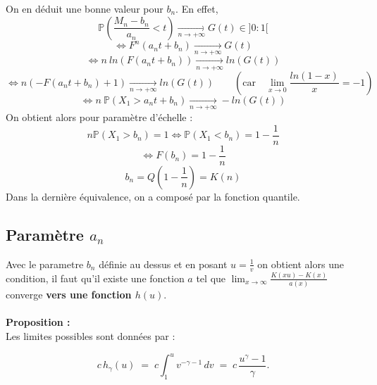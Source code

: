 \documentclass{article}
\begin{document}
On en déduit une bonne valeur pour $b_n$. En effet,
\[
\mathbb{P} \left( \frac{M_n - b_n}{a_n} < t \right) \xrightarrow[n\to +\infty]{} G(t) \in ]0:1[
\]
\[
\Longleftrightarrow F^n(a_n t + b_n) \xrightarrow[n\to +\infty]{} G(t)
\]
\[
\Longleftrightarrow n \: ln(F(a_n t + b_n)) \xrightarrow[n\to +\infty]{} ln(G(t))
\]
\[
\Longleftrightarrow n(- F(a_n t + b_n) + 1) \xrightarrow[n\to +\infty]{} ln(G(t)) \quad \quad (\text{car} \quad \lim_{x \to 0} \frac{ln(1-x)}{x} = -1)
\]
\[
\Longleftrightarrow n \: \mathbb{P}(X_1 > a_n t + b_n ) \xrightarrow[n\to +\infty]{} - ln(G(t))
\]
On obtient alors pour paramètre d'échelle :
\[
n \mathbb{P}(X_1 > b_n) =1  \Longleftrightarrow \mathbb{P}(X_1 < b_n) = 1 - \frac{1}{n}
\]
\[
\Longleftrightarrow F(b_n) = 1 - \frac{1}{n}
\]
\[
b_n = Q(1-\frac{1}{n}) = K(n)
\]
Dans la dernière équivalence, on a composé par la fonction quantile.
\\
\subsection{Paramètre $a_n$}
Avec le parametre $b_n$ définie au dessus et en posant $u=\frac{1}{v}$ on obtient alors une condition, il faut qu'il existe une fonction $a$ tel que $\lim_{x \to \infty} \frac{K(xu) - K(x)}{a(x)}$ converge \textbf{vers une fonction $h(u)$}.
\\
\\
\textbf{Proposition :}
\\
Les limites possibles sont données par :

\begin{equation}\label{eq:1.2}
    c\,h_{\gamma}(u) 
    \;=\; 
    c \int_{1}^{u} v^{-\gamma - 1}\,dv 
    \;=\; 
    c\,\frac{u^{\gamma} - 1}{\gamma}.
\end{equation}
\end{document}
